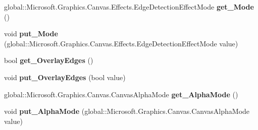 \begin{DoxyCompactItemize}
\item 
\mbox{\label{class_microsoft_1_1_graphics_1_1_canvas_1_1_effects_1_1_edge_detection_effect_a6c501576c1a32800807da3e3b7750015}} 
global\+::\+Microsoft.\+Graphics.\+Canvas.\+Effects.\+Edge\+Detection\+Effect\+Mode {\bfseries get\+\_\+\+Mode} ()
\item 
\mbox{\label{class_microsoft_1_1_graphics_1_1_canvas_1_1_effects_1_1_edge_detection_effect_a6f2ec4b23f0bd052e66ab4f0520145d5}} 
void {\bfseries put\+\_\+\+Mode} (global\+::\+Microsoft.\+Graphics.\+Canvas.\+Effects.\+Edge\+Detection\+Effect\+Mode value)
\item 
\mbox{\label{class_microsoft_1_1_graphics_1_1_canvas_1_1_effects_1_1_edge_detection_effect_a745adc8a87eda5967288647127125b99}} 
bool {\bfseries get\+\_\+\+Overlay\+Edges} ()
\item 
\mbox{\label{class_microsoft_1_1_graphics_1_1_canvas_1_1_effects_1_1_edge_detection_effect_aed02b04299f1e9aaa193a2836da03fb3}} 
void {\bfseries put\+\_\+\+Overlay\+Edges} (bool value)
\item 
\mbox{\label{class_microsoft_1_1_graphics_1_1_canvas_1_1_effects_1_1_edge_detection_effect_a807b89c06507ab3f180bd69e88b0868d}} 
global\+::\+Microsoft.\+Graphics.\+Canvas.\+Canvas\+Alpha\+Mode {\bfseries get\+\_\+\+Alpha\+Mode} ()
\item 
\mbox{\label{class_microsoft_1_1_graphics_1_1_canvas_1_1_effects_1_1_edge_detection_effect_a9a08543abae46a861e546beeb02a638c}} 
void {\bfseries put\+\_\+\+Alpha\+Mode} (global\+::\+Microsoft.\+Graphics.\+Canvas.\+Canvas\+Alpha\+Mode value)
\item 
\mbox{\label{class_microsoft_1_1_graphics_1_1_canvas_1_1_effects_1_1_edge_detection_effect_ac8fd2f7175d97d5cf3d30307d9f39bb1}} 

\end{DoxyCompactItemize}
